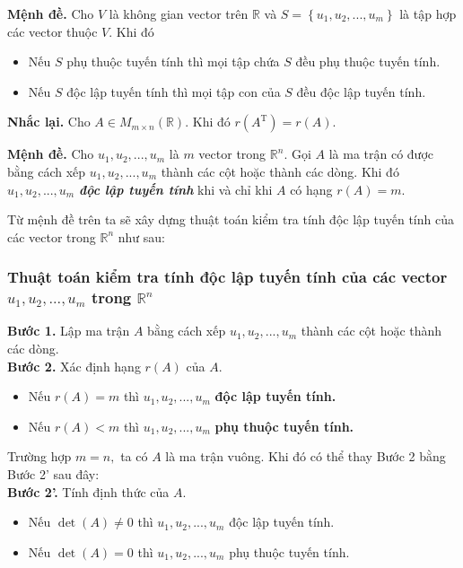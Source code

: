 \begin{mybox}
\textbf{Mệnh đề.} Cho $V$ là không gian vector trên $\mathbb{R}$ và $S = \left\{ {{u_1},{u_2},...,{u_m}} \right\}$ là tập hợp các vector thuộc $V.$ Khi đó
\begin{itemize}
\item Nếu $S$ phụ thuộc tuyến tính thì mọi tập chứa $S$ đều phụ thuộc tuyến tính.
\item Nếu $S$ độc lập tuyến tính thì mọi tập con của $S$ đều độc lập tuyến tính.
\end{itemize}
\end{mybox}
\textbf{Nhắc lại.} Cho $A \in M_{m \times n} \left( {\mathbb{R}} \right).$ Khi đó $r\left( {{A^{\mathrm{T}}}} \right) = r\left( A \right).$
\begin{mybox}
\textbf{Mệnh đề.} Cho ${u_1},{u_2},...,{u_m}$ là $m$ vector trong $\mathbb{R}^n.$ Gọi $A$ là ma trận có được bằng cách xếp ${u_1},{u_2},...,{u_m}$ thành các cột hoặc thành các dòng. Khi đó ${u_1},{u_2},...,{u_m}$ \textbf{\textit{độc lập tuyến tính}} khi và chỉ khi $A$ có hạng $r \left( A \right) = m.$
\end{mybox}
Từ mệnh đề trên ta sẽ xây dựng thuật toán kiểm tra tính độc lập tuyến tính của các vector trong $\mathbb{R}^n$ như sau:
\subsubsection{Thuật toán kiểm tra tính độc lập tuyến tính của các vector $u_1, u_2, ..., u_m$ trong $\mathbb{R}^n$}
\begin{mybox}
\textbf{Bước 1.} Lập ma trận $A$ bằng cách xếp ${u_1},{u_2},...,{u_m}$ thành các cột hoặc thành các dòng.\\
\textbf{Bước 2.} Xác định hạng $r \left( A \right)$ của $A.$
\begin{itemize}
\item Nếu $r \left( A \right) = m$ thì $u_1, u_2, ..., u_m$ \textbf{độc lập tuyến tính.}
\item Nếu $r \left( A \right) < m$ thì $u_1, u_2, ..., u_m$ \textbf{phụ thuộc tuyến tính.}
\end{itemize}
Trường hợp $m = n,$ ta có $A$ là ma trận vuông. Khi đó có thể thay Bước 2 bằng Bước 2' sau đây:\\
\textbf{Bước 2'.} Tính định thức của $A.$
\begin{itemize}
 \item Nếu $\det \left( A \right) \ne  0$ thì ${u_1},{u_2},...,{u_m}$ độc lập tuyến tính.
 \item Nếu $\det \left( A \right) = 0$ thì ${u_1},{u_2},...,{u_m}$ phụ thuộc tuyến tính.
 \end{itemize} 
\end{mybox}

